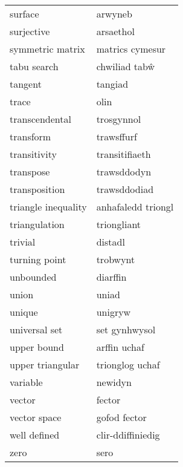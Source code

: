 \begin{supertabular}{p{0.22\textwidth}p{0.22\textwidth}}
                          surface &                          arwyneb \\
                       surjective &                        arsaethol \\
                 symmetric matrix &                  matrics cymesur \\
                      tabu search &                    chwiliad tabŵ \\
                          tangent &                          tangiad \\
                            trace &                             olin \\
                   transcendental &                       trosgynnol \\
                        transform &                       trawsffurf \\
                     transitivity &                   transitifiaeth \\
                        transpose &                      trawsddodyn \\
                    transposition &                     trawsddodiad \\
              triangle inequality &               anhafaledd triongl \\
                    triangulation &                      triongliant \\
                          trivial &                          distadl \\
                    turning point &                         trobwynt \\
                        unbounded &                         diarffin \\
                            union &                            uniad \\
                           unique &                          unigryw \\
                    universal set &                    set gynhwysol \\
                      upper bound &                     arffin uchaf \\
                 upper triangular &                  trionglog uchaf \\
                         variable &                          newidyn \\
                           vector &                           fector \\
                     vector space &                     gofod fector \\
                     well defined &                clir-ddiffiniedig \\
                             zero &                             sero \\
\end{supertabular}
